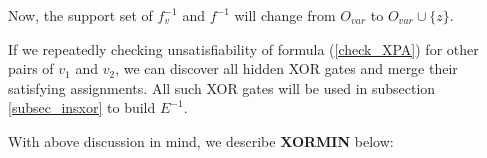 \documentclass[journal]{IEEEtran}
\begin{document}
Now,
the support set of $f^{-1}_v$ and $f^{-1}$ will change from $O_{var}$ to $O_{var}\cup \{z\}$.

If we repeatedly checking unsatisfiability of formula (\ref{check_XPA}) for other pairs of $v_1$ and $v_2$,
we can discover all hidden XOR gates and merge their satisfying assignments.
All such XOR gates will be used in subsection \ref{subsec_insxor} to build $E^{-1}$.

%

With above discussion in mind, we describe \textbf{XORMIN} below:

\vspace{0.2cm}
\end{document}
